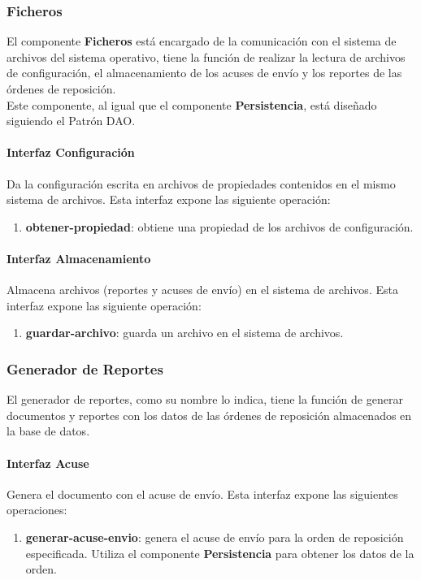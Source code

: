 \subsubsection{Ficheros}
El componente \textbf{Ficheros} está encargado de la comunicación con el sistema de archivos del sistema operativo, tiene la función de realizar la lectura de archivos de configuración, el almacenamiento de los acuses de envío y los reportes de las órdenes de reposición.\\
Este componente, al igual que el componente \textbf{Persistencia}, está diseñado siguiendo el Patrón DAO.
\paragraph{\indent Interfaz Configuración\\}
Da la configuración escrita en archivos de propiedades contenidos en el mismo sistema de archivos. Esta interfaz expone las siguiente operación:
\begin{enumerate}
	\item \textbf{obtener-propiedad}: obtiene una propiedad de los archivos de configuración.
\end{enumerate}
\paragraph{\indent Interfaz Almacenamiento\\}
Almacena archivos (reportes y acuses de envío) en el sistema de archivos. Esta interfaz expone las siguiente operación:
\begin{enumerate}
	\item \textbf{guardar-archivo}: guarda un archivo en el sistema de archivos.
\end{enumerate}
\subsubsection{Generador de Reportes}
El generador de reportes, como su nombre lo indica, tiene la función de generar documentos y reportes con los datos de las órdenes de reposición almacenados en la base de datos. 
\paragraph{\indent Interfaz Acuse\\} Genera el documento con el acuse de envío. Esta interfaz expone las siguientes operaciones:
\begin{enumerate}
	\item \textbf{generar-acuse-envio}: genera el acuse de envío para la orden de reposición especificada. Utiliza el componente \textbf{Persistencia} para obtener los datos de la orden.
\end{enumerate}
